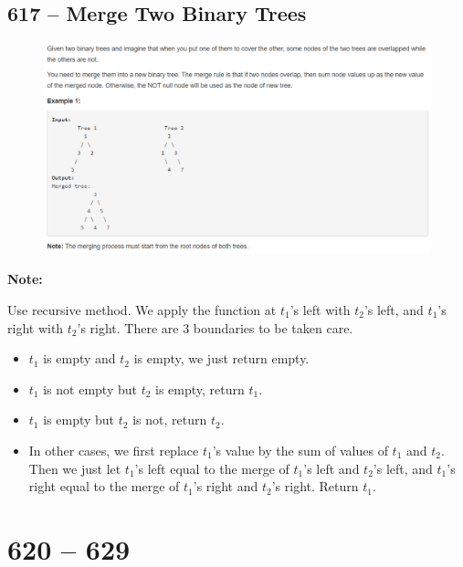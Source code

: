 \documentclass[a4paper,12pt]{article}
\begin{document}
\subsection{617 -- Merge Two Binary Trees}
\begin{figure}[H]
	\begin{center}
		\includegraphics[width=15cm]{617.png}
	\end{center}
\end{figure}
\textbf{\large{Note:}}
\par
\vspace{0.5em}
Use recursive method. We apply the function at $t_1$'s left with $t_2$'s left, and $t_1$'s right with $t_2$'s right. There are 3 boundaries to be taken care.
\begin{itemize}
	\item $t_1$ is empty and $t_2$ is empty, we just return empty.
	\item $t_1$ is not empty but $t_2$ is empty, return $t_1$.
	\item $t_1$ is empty but $t_2$ is not, return $t_2$.
	\item In other cases, we first replace $t_1$'s value by the sum of values of $t_1$ and $t_2$. Then we just let $t_1$'s left equal to the merge of $t_1$'s left and $t_2$'s left, and $t_1$'s right equal to the merge of $t_1$'s right and $t_2$'s right. Return $t_1$.
\end{itemize}

\section{620 -- 629}
\end{document}
